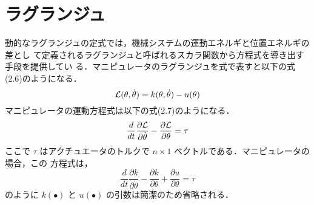 
 \section{ラグランジュ}


動的なラグランジュの定式では，機械システムの運動エネルギと位置エネルギの差とし
て定義されるラグランジュと呼ばれるスカラ関数から方程式を導き出す手段を提供してい
る．マニピュレータのラグランジュを式で表すと以下の式(2.6)のようになる．
\begin{equation}
     {\cal L}(\theta,\dot{\theta})= k(\theta,\dot{\theta})-u(\theta)
\end{equation}
マニピュレータの運動方程式は以下の式(2.7)のようになる．
\begin{equation}
     \frac{d}{dt}\frac{\partial\cal L}{\partial\dot\theta}-\frac{\partial\cal L}{\partial\theta}=\tau
\end{equation}
ここで $\tau$ はアクチュエータのトルクで $n × 1$ ベクトルである．マニピュレータの場合，この
方程式は，
\begin{equation}
     \frac{d}{dt}\frac{\partial k}{\partial\dot\theta}-\frac{\partial k}{\partial\theta}+\frac{\partial u}{\partial\theta}=\tau
\end{equation}
のように $k(∙)$ と $u(∙)$ の引数は簡潔のため省略される．
\newpage

